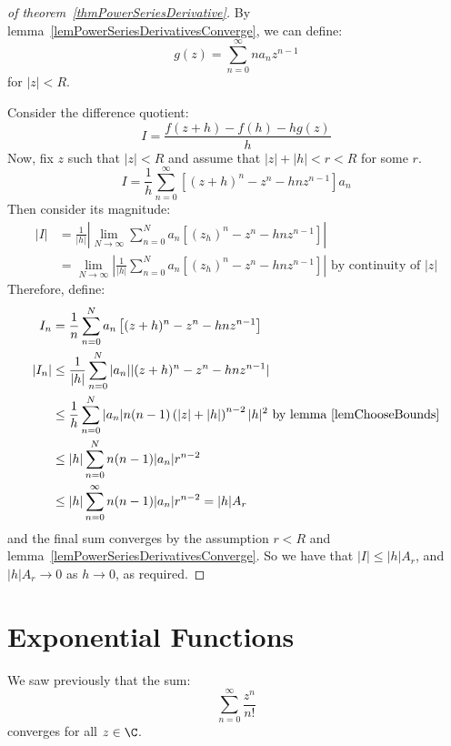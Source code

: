 \documentclass[../Main.tex]{subfiles}
\begin{document}
\begin{proof}[of theorem~\ref{thmPowerSeriesDerivative}]
    By lemma~\ref{lemPowerSeriesDerivativesConverge}, we can define:
    \begin{equation*}
        g(z) = \sum_{n=0}^\infty na_n z^{n-1}
    \end{equation*}
    for $|z| < R$.\par
    Consider the difference quotient:
    \begin{equation*}
        I = \frac{f(z + h) - f(h) - hg(z)}{h}
    \end{equation*}
    Now, fix $z$ such that $|z| < R$ and assume that $|z| + |h| < r < R$ for some $r$.
    \begin{equation*}
        I = \frac{1}{h} \sum_{n = 0}^\infty \left[(z + h)^n - z^n - hnz^{n-1}\right]a_n
    \end{equation*}
    Then consider its magnitude:
    \begin{align*}
        |I| &= \frac{1}{|h|} \left|\lim_{N \to \infty} \sum_{n = 0}^N a_n\left[(z _ h)^n - z^n - hnz^{n-1}\right]\right| \\
        &= \lim_{N \to \infty} \left|\frac{1}{|h|} \sum_{n = 0}^N a_n\left[(z _ h)^n - z^n - hnz^{n-1}\right]\right| \text{ by continuity of } |z|
    \end{align*}
    Therefore, define:
    \begin{align*}
        I_n &= \frac{1}{n} \sum_{n = 0}^N a_n \left[(z + h)^n - z^n - hnz^{n-1}\right] \\
       |I_n| &\leq \frac{1}{|h|} \sum_{n = 0}^N |a_n| |(z + h)^n - z^n - hnz^{n-1}| \\
       &\leq \frac{1}{h} \sum_{n = 0}^N |a_n| n(n-1) \left(|z| + |h|\right)^{n-2} |h|^2 \text{ by lemma~\ref{lemChooseBounds}}\\
       &\leq |h| \sum_{n = 0}^N n(n-1) |a_n| r^{n-2} \\
       &\leq |h| \sum_{n = 0}^\infty n(n-1) |a_n| r^{n-2} = |h| A_r
    \end{align*}
    and the final sum converges by the assumption $r < R$ and lemma~\ref{lemPowerSeriesDerivativesConverge}.
    So we have that $|I| \leq |h| A_r$, and $|h| A_r \to 0$ as $h \to 0$, as required.
\end{proof}
\section{Exponential Functions}
We saw previously that the sum:
\begin{equation*}
    \sum_{n = 0}^\infty \frac{z^n}{n!}
\end{equation*}
converges for all $z \in \C$.
\end{document}
